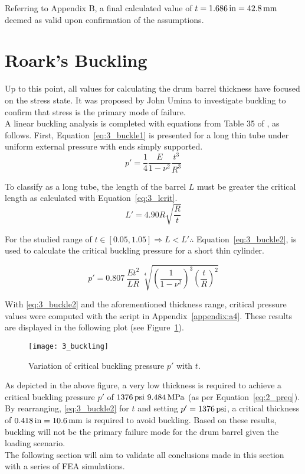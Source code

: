 Referring to Appendix B, a final calculated value of $t=1.686 \,\mathrm{in}= 42.8 \,\mathrm{mm}$ deemed as valid upon confirmation of the assumptions.

\section{Roark's Buckling}
\label{section:3_buckle}

Up to this point, all values for calculating the drum barrel thickness have focused on the stress state. It was proposed by John Umina to investigate buckling to confirm that stress is the primary mode of failure.\\

A linear buckling analysis is completed with equations from Table 35 of \cite{roarks}, as follows. First, Equation~\ref{eq:3_buckle1} is presented for a long thin tube under uniform external pressure with ends simply supported.
\begin{equation}
	\label{eq:3_buckle1}
	p' =\frac{1}{4} \frac{E}{1-\nu^2} \frac{t^3}{R^3}
\end{equation}

To classify as a long tube, the length of the barrel $L$ must be greater the critical length as calculated with Equation~\ref{eq:3_lcrit}.
\begin{equation}
	\label{eq:3_lcrit}
	L' = 4.90 R \sqrt{\frac{R}{t}}
\end{equation}

For the studied range of $t \in [0.05, 1.05] \Rightarrow L < L' \therefore$ Equation~\ref{eq:3_buckle2}, is used to calculate the critical buckling pressure for a short thin cylinder.

\begin{equation}
	\label{eq:3_buckle2}
	p' =0.807\  \frac{Et^2}{LR}\  \sqrt[4]{\left( \frac{1}{1-\nu^2} \right)^3 \left( \frac{t}{R}\right)^2}
\end{equation}

With \ref{eq:3_buckle2} and the aforementioned thickness range, critical pressure values were computed with the \cite{PYTHON} script in Appendix~\ref{appendix:a4}. These results are displayed in the following plot (see Figure~\ref{fig:3_buckling}).

\begin{figure}[H]
	\centering
	\texttt{[image: 3\_buckling]}
	\caption{Variation of critical buckling pressure $p'$ with $t$.}
	\label{fig:3_buckling}
\end{figure}

As depicted in the above figure, a very low thickness is required to achieve a critical buckling pressure $p'$ of $1376\,\mathrm{psi} \/\ 9.484\,\mathrm{MPa}$ (as per Equation~\ref{eq:2_preq}).\\

By rearranging, \ref{eq:3_buckle2} for $t$ and setting $p'=1376\,\mathrm{psi}$, a critical thickness of $0.418\,\mathrm{in}= 10.6\,\mathrm{mm}$ is required to avoid buckling. Based on these results, buckling will not be the primary failure mode for the drum barrel given the loading scenario.\\

The following section will aim to validate all conclusions made in this section with a series of FEA simulations.

